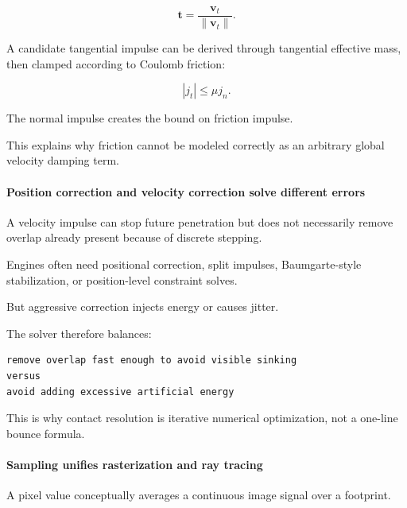 \[
\mathbf t=
\frac{\mathbf v_t}{\|\mathbf v_t\|}.
\]

A candidate tangential impulse can be derived through tangential effective mass, then clamped according to Coulomb friction:

\[
|j_t|
\le
\mu j_n.
\]

The normal impulse creates the bound on friction impulse.

This explains why friction cannot be modeled correctly as an arbitrary global velocity damping term.

\paragraph{Position correction and velocity correction solve different errors}\label{03-visual-computing-i-ch001-position-correction-and-velocity-correction-solve-different-errors}

\hypertarget{03-visual-computing-i-ch001-position-correction-and-velocity-correction-solve-different-errors}{}

A velocity impulse can stop future penetration but does not necessarily remove overlap already present because of discrete stepping.

Engines often need positional correction, split impulses, Baumgarte-style stabilization, or position-level constraint solves.

But aggressive correction injects energy or causes jitter.

The solver therefore balances:

\begin{verbatim}
remove overlap fast enough to avoid visible sinking
versus
avoid adding excessive artificial energy
\end{verbatim}

This is why contact resolution is iterative numerical optimization, not a one-line bounce formula.

\paragraph{Sampling unifies rasterization and ray tracing}\label{03-visual-computing-i-ch001-sampling-unifies-rasterization-and-ray-tracing}

\hypertarget{03-visual-computing-i-ch001-sampling-unifies-rasterization-and-ray-tracing}{}

A pixel value conceptually averages a continuous image signal over a footprint.

